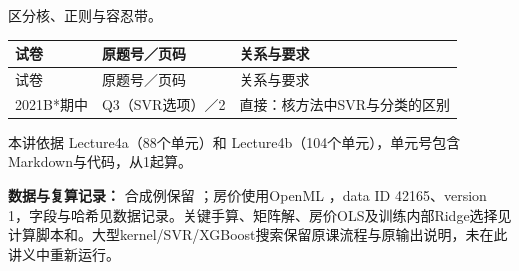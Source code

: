 

区分核、正则与容忍带。

\begingroup\small\setlength{\tabcolsep}{3pt}\renewcommand{\arraystretch}{1.22}
\begin{longtable}{@{}>{\raggedright\arraybackslash}p{}>{\raggedright\arraybackslash}p{}>{\raggedright\arraybackslash}p{}@{}}
\toprule
试卷 & 原题号／页码 & 关系与要求 \\
\midrule\endfirsthead
试卷 & 原题号／页码 & 关系与要求 \\
\midrule\endhead
\bottomrule\endfoot
2021B*期中 & Q3（SVR选项）／2 & 直接：核方法中SVR与分类的区别 \\
\end{longtable}\endgroup




本讲依据 Lecture4a（88个单元）和 Lecture4b（104个单元），单元号包含Markdown与代码，从1起算。


\textbf{数据与复算记录：} 合成例保留 ；房价使用OpenML ，data ID 42165、version 1，字段与哈希见数据记录。关键手算、矩阵解、房价OLS及训练内部Ridge选择见计算脚本和。大型kernel/SVR/XGBoost搜索保留原课流程与原输出说明，未在此讲义中重新运行。


